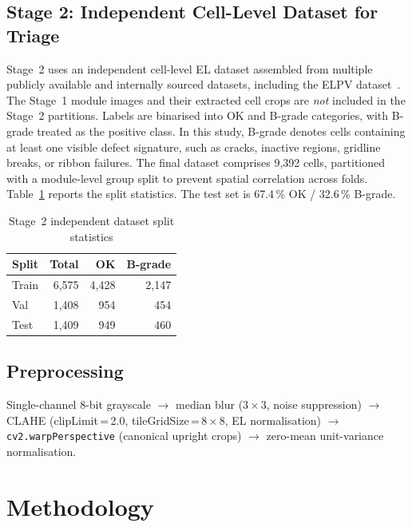 \documentclass[conference]{IEEEtran}
\begin{document}
\subsection{Stage 2: Independent Cell-Level Dataset for Triage}
Stage~2 uses an independent cell-level EL dataset assembled from multiple publicly available and internally sourced datasets, including the ELPV dataset~\cite{deitsch2019}. The Stage~1 module images and their extracted cell crops are \textit{not} included in the Stage~2 partitions. Labels are binarised into OK and B-grade categories, with B-grade treated as the positive class. In this study, B-grade denotes cells containing at least one visible defect signature, such as cracks, inactive regions, gridline breaks, or ribbon failures. The final dataset comprises 9{,}392 cells, partitioned with a module-level group split to prevent spatial correlation across folds. Table~\ref{tab:datasplit} reports the split statistics. The test set is 67.4\,\% OK / 32.6\,\% B-grade.

\begin{table}[t]
  \caption{Stage~2 independent dataset split statistics}
  \label{tab:datasplit}
  \begin{center}
  \renewcommand{\arraystretch}{0.95}\small
  \begin{tabular}{lrrr}
    \toprule
    \textbf{Split} & \textbf{Total} & \textbf{OK} & \textbf{B-grade}\\
    \midrule
    Train & 6{,}575 & 4{,}428 & 2{,}147\\
    Val   & 1{,}408 &   954   &   454\\
    Test  & 1{,}409 &   949   &   460\\
    \bottomrule
  \end{tabular}
  \end{center}
\end{table}

\subsection{Preprocessing}
Single-channel 8-bit grayscale $\to$ median blur ($3\times3$, noise suppression) $\to$ CLAHE (clipLimit\,=\,2.0, tileGridSize\,=\,$8\times8$, EL normalisation) $\to$ \texttt{cv2.warpPerspective} (canonical upright crops) $\to$ zero-mean unit-variance normalisation.

\section{Methodology}
\label{sec:method}
\end{document}
